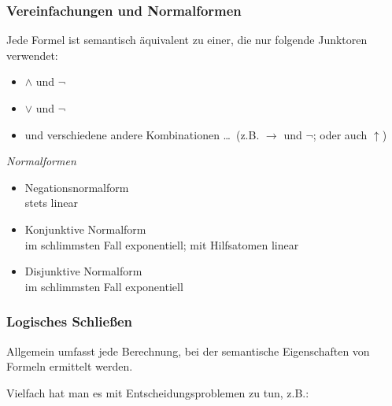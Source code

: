 \documentclass[onlymath]{beamer}
\begin{document}
\begin{frame}\frametitle{Vereinfachungen und Normalformen}

Jede Formel ist semantisch äquivalent zu einer, die nur folgende Junktoren verwendet:
\begin{itemize}
\item $\wedge$ und $\neg$
\item $\vee$ und $\neg$
\item und verschiedene andere Kombinationen \ldots\ (z.B. $\to$ und $\neg$; oder auch $\uparrow$)
\end{itemize}\medskip

\emph{Normalformen}
\begin{itemize}
\item \alert{Negationsnormalform}\\
	stets linear
\item \alert{Konjunktive Normalform}\\
	im schlimmsten Fall exponentiell; mit Hilfsatomen linear
\item \alert{Disjunktive Normalform}\\
	im schlimmsten Fall exponentiell
\end{itemize}

\end{frame}


\begin{frame}\frametitle{Logisches Schließen}

Allgemein umfasst  jede Berechnung,
bei der semantische Eigenschaften von Formeln ermittelt werden.
\bigskip

Vielfach hat man es mit Entscheidungsproblemen zu tun, z.B.:




\end{frame}
\end{document}
